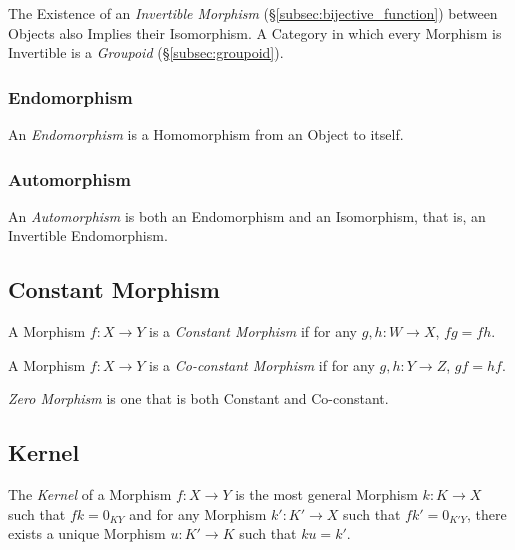The Existence of an \emph{Invertible Morphism}
(\S\ref{subsec:bijective_function}) between Objects also Implies their
Isomorphism. A Category in which every Morphism is Invertible is a
\emph{Groupoid} (\S\ref{subsec:groupoid}).



\subsubsection{Endomorphism}

An \emph{Endomorphism} is a Homomorphism from an Object to itself.



\subsubsection{Automorphism}\label{subsec:automorphism}

An \emph{Automorphism} is both an Endomorphism and an Isomorphism,
that is, an Invertible Endomorphism.



\subsection{Constant Morphism}\label{subsec:constant_morphism}

A Morphism $f : X \rightarrow Y$ is a \emph{Constant Morphism} if for
any $g, h : W \rightarrow X$, $fg = fh$.

A Morphism $f : X \rightarrow Y$ is a \emph{Co-constant Morphism} if
for any $g, h : Y \rightarrow Z$, $gf = hf$.

\emph{Zero Morphism} is one that is both Constant and Co-constant.



\subsection{Kernel}\label{subsec:morphism_kernel}

The \emph{Kernel} of a Morphism $f : X \rightarrow Y$ is the most
general Morphism $k : K \rightarrow X$ such that $fk = 0_{KY}$ and for
any Morphism $k' : K' \rightarrow X$ such that $fk' = 0_{K'Y}$, there
exists a unique Morphism $u : K' \rightarrow K$ such that $ku = k'$.



